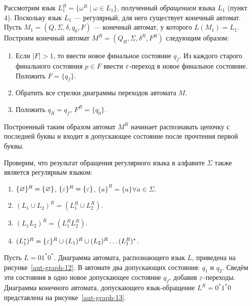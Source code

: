 Рассмотрим язык $L_1^R = \{ \omega^R \mid \omega \in L_1 \}$, 
полученный \emph{обращением} языка $L_1$ (пункт $4$). Поскольку язык 
$L_1$ --- регулярный, для него существует конечный автомат. Пусть $M_1 
= (Q,\Sigma, \delta, q_0, F)$ --- конечный автомат, у которого $L(M_1) 
= L_1$. Построим конечный автомат $M^R = (Q_R, \Sigma, \delta^R, F^R)$ 
следующим образом:
%
\begin{enumerate}

\item Если $\mid F \mid > 1$, то ввести новое финальное состояние 
$q_f$. Из каждого старого финального состояния $p \in F$ ввести 
$\varepsilon$-переход в новое финальное состояние. Положить $F = \{ q_f \}$.

\item Обратить все стрелки диаграммы переходов автомата $M$.

\item Положить $q_R = q_f$, $F^R = \{ q_0 \}$.

\end{enumerate}
%
Построенный таким образом автомат $M^R$ начинает распознавать цепочку с 
последней буквы и входит в допускающее состояние после прочтения первой 
буквы.

Проверим, что результат обращения регулярного языка в алфавите $\Sigma$ 
также является регулярным языком:
\begin{enumerate}
\item $\{ \varnothing \}^R = \{ \varnothing \} $, $\{ \varepsilon \}^R = \{ \varepsilon \} $, $\{ a \}^R = \{ a \} \forall a \in \Sigma $.
\item $(L_1 \cup L_2)^R = (L_{1}^R \cup L_{2}^R)$.
\item $(L_1 L_2)^R = (L_{1}^R L_{2}^R)$.
\item $(L_{1}^*)^R = \{ \varepsilon \}^R \cup (L_1)^R \cup (L_2)^R \ldots (L_{1}^R)^*$.
\end{enumerate}




\begin{myexample}\label{ex-511}
Пусть $L = 01^*0^*$. Диаграмма автомата, 
распознающего язык $L$, приведена на рисунке~\ref{aut-graph-12}. В 
автомате два допускающих состояния: $q_1$ и $q_2$. Сведём эти состояния в 
одно новое допускающее состояние $q_f$, добавив $\varepsilon$-переходы. 
Диаграмма конечного автомата, допускающего язык-обращение $L^R = 0^*1^*0$ 
представлена на рисунке~\ref{aut-graph-13}.
\end{myexample}

